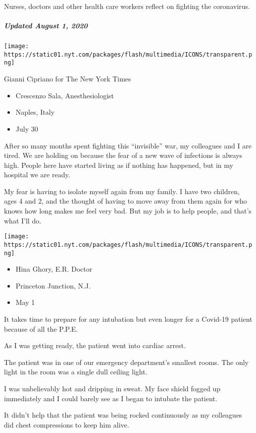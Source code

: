 Nurses, doctors and other health care workers reflect on fighting the
coronavirus.

\hypertarget{updated-august-1-2020-3}{%
\subparagraph{Updated August 1, 2020}\label{updated-august-1-2020-3}}

\texttt{[image: https://static01.nyt.com/packages/flash/multimedia/ICONS/transparent.png]}

Gianni Cipriano for The New York Times

\begin{itemize}
\tightlist
\item
  Crescenzo Sala, Anesthesiologist
\item
  Naples, Italy
\item
  July 30
\end{itemize}

After so many months spent fighting this ``invisible'' war, my
colleagues and I are tired. We are holding on because the fear of a new
wave of infections is always high. People here have started living as if
nothing has happened, but in my hospital we are ready.

My fear is having to isolate myself again from my family. I have two
children, ages 4 and 2, and the thought of having to move away from them
again for who knows how long makes me feel very bad. But my job is to
help people, and that's what I'll do.

\texttt{[image: https://static01.nyt.com/packages/flash/multimedia/ICONS/transparent.png]}

\begin{itemize}
\tightlist
\item
  Hina Ghory, E.R. Doctor
\item
  Princeton Junction, N.J.
\item
  May 1
\end{itemize}

It takes time to prepare for any intubation but even longer for a
Covid-19 patient because of all the P.P.E.

As I was getting ready, the patient went into cardiac arrest.

The patient was in one of our emergency department's smallest rooms. The
only light in the room was a single dull ceiling light.

I was unbelievably hot and dripping in sweat. My face shield fogged up
immediately and I could barely see as I began to intubate the patient.

It didn't help that the patient was being rocked continuously as my
colleagues did chest compressions to keep him alive.

